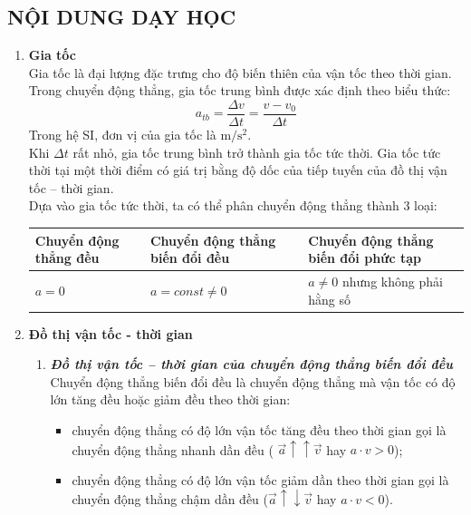 \subsection{NỘI DUNG DẠY HỌC}
\begin{enumerate}[label=\bfseries\arabic*.]
	\item \textbf{Gia tốc}\\
	Gia tốc là đại lượng đặc trưng cho độ biến thiên của vận tốc theo thời gian. Trong chuyển động thẳng, gia tốc trung bình được xác định theo biểu thức:
	\begin{equation}
		a_{tb}=\dfrac{\Delta v}{\Delta t}=\dfrac{v-v_0}{\Delta t}
	\end{equation}
	Trong hệ SI, đơn vị của gia tốc là $\si{\meter/\second^2}$.\\
	Khi $\Delta t$ rất nhỏ, gia tốc trung bình trở thành gia tốc tức thời. Gia tốc tức thời tại một thời điểm có giá trị bằng độ dốc của tiếp tuyến của đồ thị vận tốc – thời gian.\\
	Dựa vào gia tốc tức thời, ta có thể phân chuyển động thẳng thành 3 loại:
	\begin{center}
		\begin{tabular}{|M{5cm}|M{5cm}|M{6cm}|}
			\hline
			Chuyển động thẳng đều & Chuyển động thẳng biến đổi đều & Chuyển động thẳng biến đổi phức tạp\\
			\hline
			$a=0$ & $a=const\neq0$ & $a\neq0$ nhưng không phải hằng số\\
			\hline
		\end{tabular}
	\end{center}
	\item \textbf{Đồ thị vận tốc - thời gian}\\
	\begin{enumerate}[label=\bfseries \itshape 2.\arabic*., nolistsep]
		\item  \textbf{\textit{Đồ thị vận tốc – thời gian của chuyển động thẳng biến đổi đều}}\\
		Chuyển động thẳng biến đổi đều là chuyển động thẳng mà vận tốc có độ lớn tăng đều hoặc giảm đều theo thời gian:
		\begin{itemize}
			\item chuyển động thẳng có độ lớn vận tốc tăng đều theo thời gian gọi là chuyển động thẳng nhanh dần đều ( $\vec{a}\uparrow\uparrow\vec{v}$ hay $a\cdot v>0$);
			\item chuyển động thẳng có độ lớn vận tốc giảm dần theo thời gian gọi là chuyển động thẳng chậm dần đều ($\vec{a}\uparrow\downarrow\vec{v}$  hay  $a\cdot v<0$).
			

\end{itemize}
\end{enumerate}
\end{enumerate}
